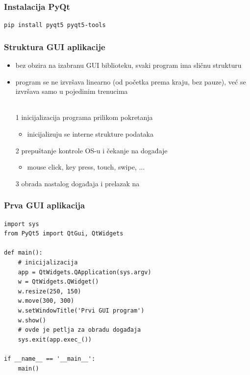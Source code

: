 \documentclass[utf8,compress,aspectratio=169]{beamer}
\begin{document}
\begin{frame}[fragile]
  \frametitle{Instalacija PyQt}
\begin{verbatim}
pip install pyqt5 pyqt5-tools
\end{verbatim}
\end{frame}

\begin{frame}[fragile]
  \frametitle{Struktura GUI aplikacije}
  \begin{itemize}
    \item bez obzira na izabranu GUI biblioteku, svaki program ima sličnu strukturu
    \item program se ne izvršava linearno (od početka prema kraju, bez pauze), već se izvršava samo u pojedinim trenucima \\ \ \\
    \item[1] inicijalizacija programa prilikom pokretanja
    \begin{itemize}
      \item inicijalizuju se interne strukture podataka
    \end{itemize}
    \item[2] prepuštanje kontrole OS-u i čekanje na događaje
    \begin{itemize}
      \item mouse click, key press, touch, swipe, ...
    \end{itemize}
    \item[3] obrada nastalog događaja i prelazak na 
  \end{itemize}
\end{frame}

\begin{frame}[fragile]
  \frametitle{Prva GUI aplikacija}
\begin{verbatim}
import sys
from PyQt5 import QtGui, QtWidgets

def main():
    # inicijalizacija
    app = QtWidgets.QApplication(sys.argv)
    w = QtWidgets.QWidget()
    w.resize(250, 150)
    w.move(300, 300)
    w.setWindowTitle('Prvi GUI program')
    w.show()
    # ovde je petlja za obradu događaja
    sys.exit(app.exec_())

if __name__ == '__main__':
    main()
\end{verbatim}
\end{frame}
\end{document}
